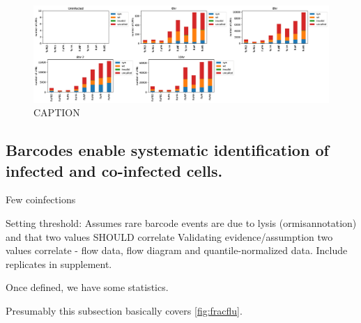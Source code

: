 \documentclass[9pt,lineno]{elife}
\begin{document}
\begin{figure}
\includegraphics[width=\linewidth]{figures/synbarcodes_umistats.jpg}
\caption{
CAPTION}
\label{fig:synbarcodes}
\end{figure}

\subsection{Barcodes enable systematic identification of infected and co-infected cells.}
Few coinfections

Setting threshold: Assumes rare barcode events are due to lysis (ormisannotation)  and that two values SHOULD correlate
Validating evidence/assumption two values correlate - flow data, flow diagram and quantile-normalized data. Include replicates in supplement.

Once defined, we have some statistics.

Presumably this subsection basically covers \ref{fig:fracflu}.
\end{document}
